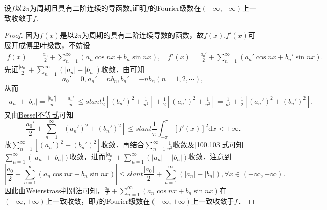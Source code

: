 \documentclass[../../main.tex]{subfiles}
\begin{document}
\begin{example}
设$f$以$2\pi$为周期且具有二阶连续的导函数,证明$f$的Fourier级数在$(-\infty,+\infty)$上一致收敛于$f$.
\end{example}
\begin{proof}
因为$f(x)$是以$2\pi$为周期的具有二阶连续导数的函数，故$f(x)$,$f'(x)$可展开成傅里叶级数，不妨设
\begin{align*}
f(x) &=\frac{a_0}{2}+\sum_{n=1}^{\infty}(a_n\cos nx+b_n\sin nx),\quad f'(x)=\frac{a_{0}'}{2}+\sum_{n=1}^{\infty}(a_{n}'\cos nx+b_{n}'\sin nx).
\end{align*}
先证$\frac{|a_0|}{2}+\sum_{n=1}^{\infty}(|a_n|+|b_n|)$收敛．由可知
$$a_{0}'=0,a_{n}'=nb_n,b_{n}'=-nb_n(n=1,2,\cdots),$$
从而
\begin{align}
|a_n|+|b_n|=\frac{|b_{n}'|}{n}+\frac{|a_{n}'|}{n}\leqslant slant \frac{1}{2}\left[(b_{n}')^2+\frac{1}{n^2}\right]+\frac{1}{2}\left[(a_{n}')^2+\frac{1}{n^2}\right]
=\frac{1}{n^2}+\frac{1}{2}\left[(a_{n}')^2+(b_{n}')^2\right].\label{100.103}
\end{align}
又由\hyperref[theorem:Bessel不等式]{Bessel不等式}可知
$$\frac{a_{0}'}{2}+\sum_{n=1}^{\infty}\left[(a_{n}')^2+(b_{n}')^2\right]\leqslant slant \frac{1}{\pi}\int_{-\pi}^{\pi}[f'(x)]^2\mathrm{d}x<+\infty.$$
故$\sum_{n=1}^{\infty}\left[(a_{n}')^2+(b_{n}')^2\right]$收敛．再结合$\sum_{n=1}^{\infty}\frac{1}{n^2}$收敛及\eqref{100.103}式可知$\sum_{n=1}^{\infty}(|a_n|+|b_n|)$收敛，进而$\frac{|a_0|}{2}+\sum_{n=1}^{\infty}(|a_n|+|b_n|)$收敛．注意到
$$\left|\frac{a_0}{2}+\sum_{n=1}^{\infty}(a_n\cos nx+b_n\sin nx)\right|\leqslant slant \frac{|a_0|}{2}+\sum_{n=1}^{\infty}(|a_n|+|b_n|),\forall x\in(-\infty,+\infty).$$
因此由Weierstrass判别法可知，$\frac{a_0}{2}+\sum_{n=1}^{\infty}(a_n\cos nx+b_n\sin nx)$在$(-\infty,+\infty)$上一致收敛，即$f$的Fourier级数在$(-\infty,+\infty)$上一致收敛于$f$．
\end{proof}
\end{document}
